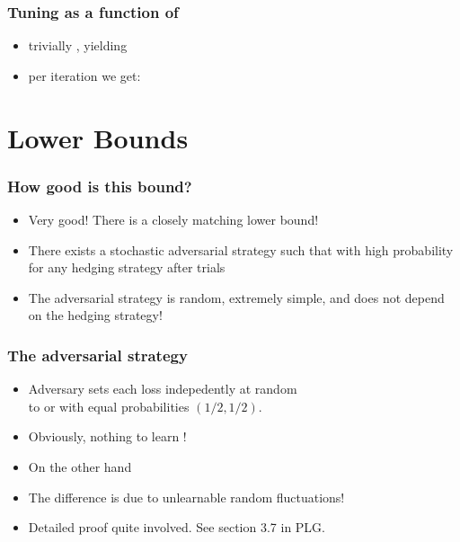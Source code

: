 \documentclass[handout]{beamer}
\begin{document}
\begin{frame}
\frametitle{Tuning \R{$\eta$} as a function of }
\begin{itemize}
\item trivially , yielding
\item per iteration we get:
\end{itemize}
\end{frame}

\section{Lower Bounds}
\begin{frame}
\frametitle{How good is this bound?}
\begin{itemize}
\item
{\color{blue} Very good!} There is a closely matching lower bound!
\item
There exists a stochastic adversarial strategy such that with high
probability for \alert{any} hedging strategy  after  trials
\item
The adversarial strategy is random, extremely simple, and does not
depend on the hedging strategy! 
\end{itemize}
\end{frame}

\begin{frame}
\frametitle{The adversarial strategy}
\begin{itemize}
\item
Adversary sets each loss  indepedently at random \\
to  or  with equal probabilities $(1/2,1/2)$.
\item
Obviously, nothing to learn !\\
\item
On the other hand 
\item
The difference  is due to unlearnable
random fluctuations!
\item
Detailed proof quite involved. See section 3.7 in PLG.
\end{itemize}
\end{frame}
\end{document}
